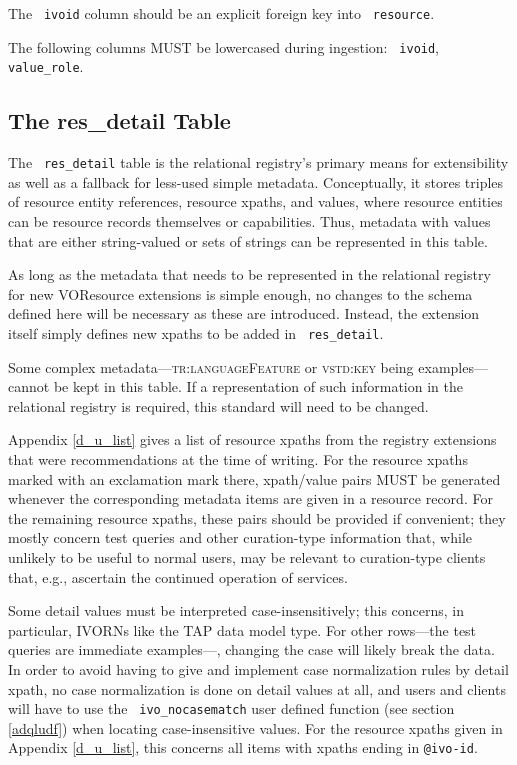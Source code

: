 \documentclass[11pt,a4paper]{ivoa}
\newcommand{\rtent}[1]{\texttt{\color{rtcolor} #1}}
\newcommand{\vorent}[1]{\textsc{#1}}
\begin{document}

 

The \rtent{ivoid} column should be an explicit foreign key into
\rtent{resource}.

The following columns MUST be lowercased during ingestion:
\rtent{ivoid}, \rtent{value\_role}.




\subsection{The res\_detail Table}

\label{table_res_detail}

The \rtent{res\_detail} table is the relational registry's primary means for
extensibility as well as a fallback for less-used simple
metadata.  Conceptually, it stores triples of resource entity
references, resource xpaths,
and values, where resource entities can be resource records themselves
or capabilities.  Thus, metadata with values that are either
string-valued or sets of strings can be represented in this table.

As long as the metadata that needs to be represented in the
relational registry for new VOResource extensions is simple enough, no changes to the schema defined
here will be necessary as these are introduced.  Instead, the extension itself simply defines
new xpaths to be added in \rtent{res\_detail}.

Some complex metadata—\vorent{tr:languageFeature} or
\vorent{vstd:key} being examples—cannot be kept in this table.
If a representation of such information in the relational registry is
required, this standard will need to be changed.

Appendix \ref{d_u_list} gives a list
of resource xpaths from the registry extensions
that were recommendations at the time of writing.  
For the resource xpaths marked with an exclamation mark there,
xpath/value pairs MUST be generated whenever the corresponding
metadata items are given in a resource record.
For the remaining resource xpaths, these pairs should be provided if
convenient; they mostly concern test queries and other curation-type
information that, while unlikely to be useful to normal users, may be
relevant to curation-type clients that, e.g., ascertain the continued 
operation of services.

Some detail values must be interpreted case-insensitively; this
concerns, in particular, IVORNs like the TAP data model type.  For other
rows—the test queries are immediate examples—, changing the case
will likely break the data.  In order to avoid having to give and
implement case normalization rules by detail xpath, no case normalization 
is done on detail values at all, and users and clients will have to use
the \rtent{ivo\_nocasematch} user defined function (see section
\ref{adqludf}) when locating
case-insensitive values.  For the resource xpaths given in Appendix \ref{d_u_list}, this concerns all items with xpaths ending
in \texttt{@ivo-id}.
\end{document}
